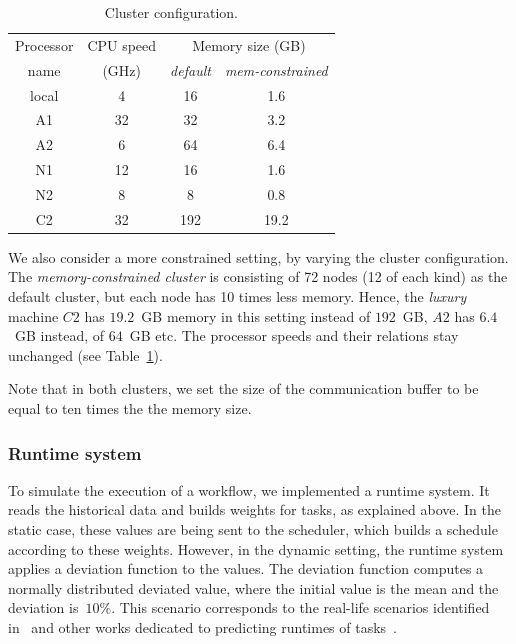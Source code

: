 \documentclass[conference]{IEEEtran}
\begin{document}
    \begin{table}[htb]
        \begin{center}
            \begin{tabular}{c|c|cc}
                \toprule
                Processor  %
                &  CPU speed   & \multicolumn{2}{c}{Memory size (GB)} \\
                name & (GHz) & {\em default} & {\em mem-constrained} \\
                \midrule
                local                    & 4                    & 16     & 1.6 \\
                A1                      & 32                   & 32     & 3.2 \\
                A2                      & 6                    & 64    & 6.4 \\
                N1                      & 12                   & 16     & 1.6 \\
                N2                      & 8                    & 8      & 0.8\\
                C2                      & 32                   & 192   &  19.2\\
                \bottomrule
            \end{tabular}
        \end{center}
        \caption{Cluster configuration.}
        \label{tab:procs}
    \end{table}

    We also consider a more constrained setting, by varying the cluster configuration. The
     {\em memory-constrained cluster} is consisting of 72 nodes (12 of each kind) as the default cluster,
     but each node has 10 times less memory. Hence,  
     the {\em luxury} machine $C2$ has $19.2$~GB memory in this setting instead of $192$~GB, 
     $A2$ has $6.4$~GB instead, of $64$~GB etc.
    The processor speeds and their relations stay unchanged (see Table~\ref{tab:procs}).

Note that in both clusters, we set the size of the communication buffer to be equal
to ten times the the memory size.

    \subsubsection{Runtime system}

    To simulate the execution of a workflow, we implemented a runtime system.
    It reads the historical data and builds weights for tasks, as explained above.
    In the static case, these values are being sent to the scheduler, which builds a schedule
    according to these weights.
    However, in the dynamic setting, the runtime system applies a deviation function to the values.
    The deviation function computes a normally distributed deviated value, where the initial value
    is the mean and the deviation is~$10\%$.
    This scenario corresponds to the real-life scenarios identified in~\cite{lotaru} and
    other works dedicated to predicting runtimes of tasks~\cite{da2015online,da2013toward}.
\end{document}
